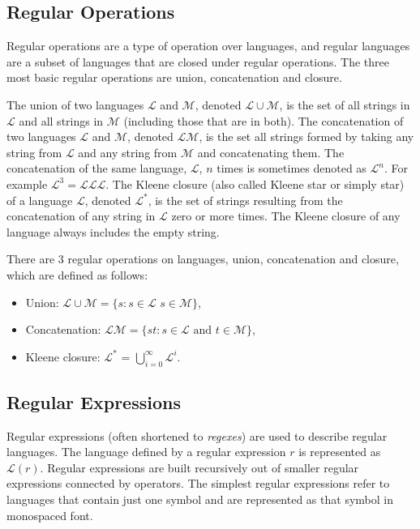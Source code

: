 \subsection{Regular Operations}
Regular operations are a type of operation over languages, and regular languages are a subset of languages that are closed under regular operations. The three most basic regular operations are union, concatenation and closure.

The union of two languages \(\mathcal{L}\) and \(\mathcal{M}\), denoted \(\mathcal{L} \cup \mathcal{M}\), is the set of all strings in \(\mathcal{L}\) and all strings in \(\mathcal{M}\) (including those that are in both).
The concatenation of two languages \(\mathcal{L}\) and \(\mathcal{M}\), denoted \(\mathcal{L}\mathcal{M}\), is the set all strings formed by taking any string from \(\mathcal{L}\) and any string from \(\mathcal{M}\) and concatenating them. The concatenation of the same language, \(\mathcal{L}\), \(n\) times is sometimes denoted as \(\mathcal{L}^n\). For example  \(\mathcal{L}^3 = \mathcal{L}\mathcal{L}\mathcal{L}\).
The Kleene closure\footnotemark{} (also called Kleene star or simply star) of a language \(\mathcal{L}\), denoted \(\mathcal{L}^*\), is the set of strings resulting from the concatenation of any string in \(\mathcal{L}\) zero or more times. The Kleene closure of any language always includes the empty string.

\begin{definition} There are 3 regular operations on languages, union, concatenation and closure, which are defined as follows:
\begin{itemize}
\item Union: \(\mathcal{L} \cup \mathcal{M} = \{s :s \in \mathcal{L}\)  \(s \in \mathcal{M}\}\),

\item Concatenation: \(\mathcal{L}\mathcal{M} =\{st : s \in \mathcal{L} \text{ and } t \in \mathcal{M}\}\),

\item Kleene closure: \(\mathcal{L}^*\) = \(\bigcup_{i=0}^\infty \mathcal{L}^i\).
\end{itemize}
\end{definition}

\subsection{Regular Expressions} \label{sec:back-regex}
Regular expressions (often shortened to \textit{regexes}) are used to describe regular languages. The language defined by a regular expression \(r\) is represented as \(\mathcal{L}(r)\).
Regular expressions are built recursively out of smaller regular expressions connected by operators. The simplest regular expressions refer to languages that contain just one symbol and are represented as that symbol in monospaced font.

